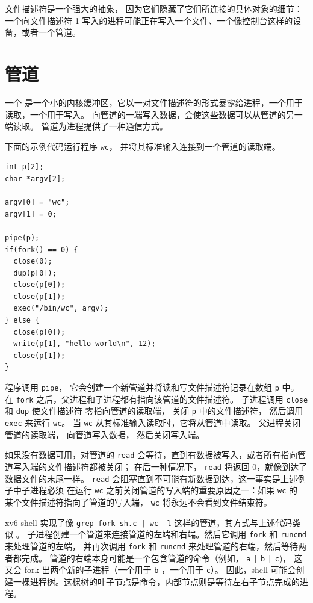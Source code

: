 文件描述符是一个强大的抽象，
因为它们隐藏了它们所连接的具体对象的细节：
一个向文件描述符 1 写入的进程可能正在写入一个文件、一个像控制台这样的设备，或者一个管道。
\section{管道}

一个
是一个小的内核缓冲区，它以一对文件描述符的形式暴露给进程，一个用于读取，一个用于写入。
向管道的一端写入数据，会使这些数据可以从管道的另一端读取。
管道为进程提供了一种通信方式。

下面的示例代码运行程序
\lstinline{wc}，
并将其标准输入连接到一个管道的读取端。
\begin{lstlisting}[]
int p[2];
char *argv[2];

argv[0] = "wc";
argv[1] = 0;

pipe(p);
if(fork() == 0) {
  close(0);
  dup(p[0]);
  close(p[0]);
  close(p[1]);
  exec("/bin/wc", argv);
} else {
  close(p[0]);
  write(p[1], "hello world\n", 12);
  close(p[1]);
}
\end{lstlisting}
程序调用
\lstinline{pipe}，
它会创建一个新管道并将读和写文件描述符记录在数组
\lstinline{p}
中。
在
\lstinline{fork}
之后，父进程和子进程都有指向该管道的文件描述符。
子进程调用 \lstinline{close} 和 \lstinline{dup} 使文件描述符
零指向管道的读取端，
关闭
\lstinline{p}
中的文件描述符，
然后调用 \lstinline{exec} 来运行
\lstinline{wc}。
当 
\lstinline{wc}
从其标准输入读取时，它将从管道中读取。
父进程关闭管道的读取端，
向管道写入数据，
然后关闭写入端。

如果没有数据可用，对管道的
\lstinline{read}
会等待，直到有数据被写入，或者所有指向管道写入端的文件描述符都被关闭；
在后一种情况下，
\lstinline{read}
将返回 0，就像到达了数据文件的末尾一样。
\lstinline{read}
会阻塞直到不可能有新数据到达，这一事实是上述例子中子进程必须
在运行
\lstinline{wc}
之前关闭管道的写入端的重要原因之一：如果
\lstinline{wc} 的
某个文件描述符指向了管道的写入端，
\lstinline{wc}
将永远不会看到文件结束符。

xv6 shell 实现了像
\lstinline{grep fork sh.c | wc -l}
这样的管道，其方式与上述代码类似
。
子进程创建一个管道来连接管道的左端和右端。然后它调用
\lstinline{fork}
和
\lstinline{runcmd}
来处理管道的左端，
并再次调用
\lstinline{fork}
和
\lstinline{runcmd}
来处理管道的右端，然后等待两者都完成。
管道的右端本身可能是一个包含管道的命令（例如，
\lstinline{a}
\lstinline{|}
\lstinline{b}
\lstinline{|}
\lstinline{c})，
这又会 fork 出两个新的子进程（一个用于
\lstinline{b}
，一个用于
\lstinline{c}）。
因此，shell 可能会创建一棵进程树。这棵树的叶子节点是命令，内部节点则是等待左右子节点完成的进程。

